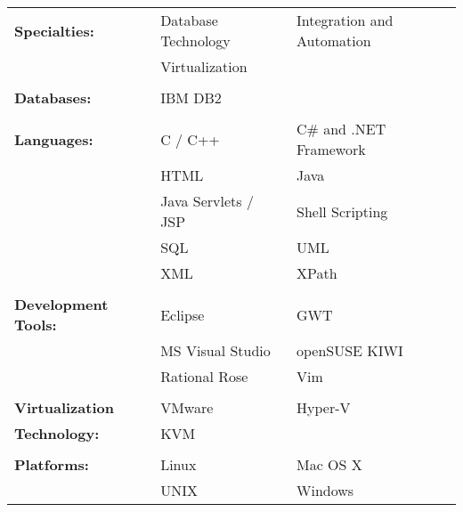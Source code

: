 \documentclass[margin,line]{resume}
\begin{document}
\begin{resume}
\begin{tabular}{@{}p{1.75in}p{1.75in}p{1.75in}}

\textbf{Specialties:}			&	Database Technology	&	Integration and Automation	\\
					&	Virtualization		&					\\
\\
\textbf{Databases:}			&	IBM DB2			&					\\
\\
\textbf{Languages:}			&	C / C++			&	C\# and .NET Framework		\\
					&	HTML			&	Java				\\
					&	Java Servlets / JSP	&	Shell Scripting			\\
					&	SQL			&	UML				\\
					&	XML			&	XPath				\\
\\
\textbf{Development Tools:}		&	Eclipse			&	GWT				\\
					&	MS Visual Studio	&	openSUSE KIWI			\\
					&	Rational Rose		&	Vim				\\
\\
\textbf{Virtualization }		&	VMware			&	Hyper-V				\\
\textbf{Technology:}			&	KVM			&					\\
\\
\textbf{Platforms:}			&	Linux			&	Mac OS X			\\
					&	UNIX			&	Windows				\\

\end{tabular}

%

\end{resume}
\end{document}
